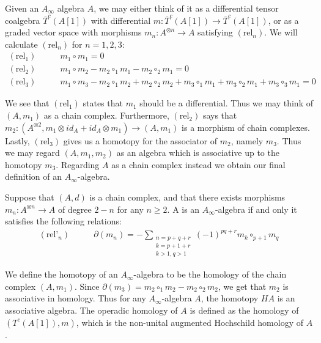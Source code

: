 \documentclass[../thesis.tex]{subfiles}
\begin{document}
        Given an $A_\infty$ algebra $A$, we may either think of it as a differential tensor coalgebra $\overline{T}^c(A[1])$ with differential $m: \overline{T}^c(A[1])\rightarrow \overline{T}^c(A[1])$, or as a graded vector space with morphisms $m_n:A^{\otimes n} \rightarrow A$ satisfying $(\text{rel}_n)$. We will calculate $(\text{rel}_n)$ for $n=1,2,3$:
        \begin{align*}
            (\text{rel}_1)\qquad & m_1\circ m_1 = 0 \\
            (\text{rel}_2)\qquad & m_1\circ m_2 - m_2\circ_{1}m_1 - m_2\circ_2m_1 = 0 \\
            (\text{rel}_3)\qquad & m_1\circ m_3 - m_2\circ_1 m_2 + m_2\circ_2m_2 + m_3\circ_1m_1 + m_3\circ_2m_1 + m_3\circ_3m_1 = 0 
        \end{align*}

        We see that $(\text{rel}_1)$ states that $m_1$ should be a differential. Thus we may think of $(A, m_1)$ as a chain complex. Furthermore, $(\text{rel}_2)$ says that $m_2 : (A^{\otimes 2}, m_1\otimes id_A + id_A\otimes m_1) \rightarrow (A, m_1)$ is a morphism of chain complexes. Lastly, $(\text{rel}_3)$ gives us a homotopy for the associator of $m_2$, namely $m_3$. Thus we may regard $(A, m_1, m_2)$ as an algebra which is associative up to the homotopy $m_3$. Regarding $A$ as a chain complex instead we obtain our final definition of an $A_\infty$-algebra.

        \begin{proposition}
            Suppose that $(A, d)$ is a chain complex, and that there exists morphisms $m_n: A^{\otimes n} \rightarrow A$ of degree $2-n$ for any $n\geq 2$. A is an $A_\infty$-algebra if and only it satisfies the following relations:
            \begin{align*}
                (\text{rel'}_n)\qquad & \partial(m_n) = -\sum_{\substack{n = p + q + r \\ k = p + 1 + r \\ k > 1, q > 1}}(-1)^{pq + r}m_k\circ_{p+1}m_q
            \end{align*}
        \end{proposition}

        We define the homotopy of an $A_\infty$-algebra to be the homology of the chain complex $(A, m_1)$. Since $\partial(m_3) = m_2\circ_1m_2 - m_2\circ_2m_2$, we get that $m_2$ is associative in homology. Thus for any $A_\infty$-algebra $A$, the homotopy $HA$ is an associative algebra. The operadic homology of $A$ is defined as the homology of $(T^c(A[1]), m)$, which is the non-unital augmented Hochschild homology of $A$.
\end{document}
